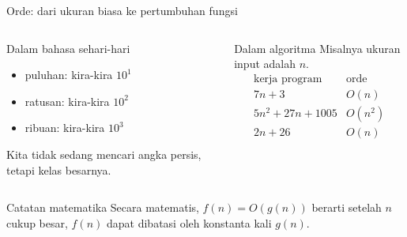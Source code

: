 \documentclass[aspectratio=169,11pt]{beamer}
\begin{document}
\begin{frame}{Orde: dari ukuran biasa ke pertumbuhan fungsi}
\begin{columns}[T]
\begin{block}{Dalam bahasa sehari-hari}
\begin{itemize}
\item puluhan: kira-kira $10^1$
\item ratusan: kira-kira $10^2$
\item ribuan: kira-kira $10^3$
\end{itemize}
Kita tidak sedang mencari angka persis, tetapi kelas besarnya.
\end{block}
\begin{block}{Dalam algoritma}
Misalnya ukuran input adalah $n$.
\[
\begin{array}{c|c}
\text{kerja program} & \text{orde}\\
\hline
7n+3 & O(n)\\
5n^2+27n+1005 & O(n^2)\\
2n+26 & O(n)
\end{array}
\]
\end{block}
\end{columns}
\vspace{1mm}
\begin{alertblock}{Catatan matematika}
Secara matematis, $f(n)=O(g(n))$ berarti setelah $n$ cukup besar, $f(n)$ dapat dibatasi oleh konstanta kali $g(n)$.
\end{alertblock}
\end{frame}
\end{document}
